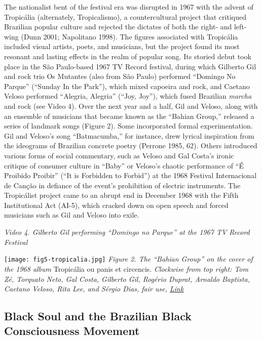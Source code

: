 \documentclass[twoside]{article}
\begin{document}
The nationalist bent of the festival era was disrupted in 1967 with the
advent of Tropicália (alternately, Tropicalismo), a countercultural
project that critiqued Brazilian popular culture and rejected the
dictates of both the right- and left-wing (Dunn 2001; Napolitano 1998).
The figures associated with Tropicália included visual artists, poets,
and musicians, but the project found its most resonant and lasting
effects in the realm of popular song. Its storied debut took place in
the São Paulo-based 1967 TV Record festival, during which Gilberto Gil
and rock trio Os Mutantes (also from São Paulo) performed ``Domingo No
Parque'' (``Sunday In the Park''), which mixed capoeira and rock, and
Caetano Veloso performed ``Alegria, Alegria'' (``Joy, Joy''), which
fused Brazilian \emph{marcha} and rock (see Video 4). Over the next year
and a half, Gil and Veloso, along with an ensemble of musicians that
became known as the ``Bahian Group,'' released a series of landmark
songs (Figure 2). Some incorporated formal experimentation. Gil and
Veloso's song ``Batmacumba,'' for instance, drew lyrical inspiration
from the ideograms of Brazilian concrete poetry (Perrone 1985, 62).
Others introduced various forms of social commentary, such as Veloso and
Gal Costa's ironic critique of consumer culture in ``Baby'' or Veloso's
chaotic performance of ``É Proibido Proibir'' (``It is Forbidden to
Forbid'') at the 1968 Festival Internacional de Canção in defiance of
the event's prohibition of electric instruments. The Tropicálist project
came to an abrupt end in December 1968 with the Fifth Institutional Act
(AI-5), which cracked down on open speech and forced musicians such as
Gil and Veloso into exile.

\emph{Video 4. Gilberto Gil performing ``Domingo no Parque'' at the 1967
TV Record Festival}

\texttt{[image: fig5-tropicalia.jpg]} \emph{Figure 2. The ``Bahian
Group'' on the cover of the 1968 album} Tropicália ou panis et
circencis. \emph{Clockwise from top right: Tom Zé, Torquato Neto, Gal
Costa, Gilberto Gil, Rogério Duprat, Arnaldo Baptista, Caetano Veloso,
Rita Lee, and Sérgio Dias, fair use,
\href{https://en.wikipedia.org/wiki/Tropicália:_ou_Panis_et_Circencis\#/media/File:Tropicália_LP.JPG}{Link}}

\hypertarget{black-soul-and-the-brazilian-black-consciousness-movement}{%
\subsection*{Black Soul and the Brazilian Black Consciousness
Movement}\label{black-soul-and-the-brazilian-black-consciousness-movement}}
\end{document}
